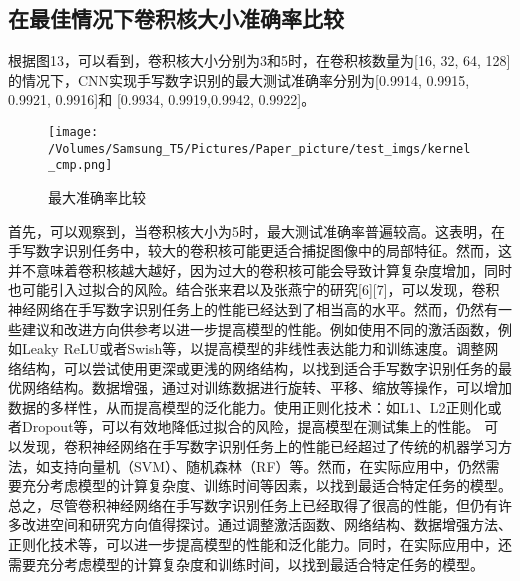 \documentclass[11pt]{article}
\begin{document}
\subsection{在最佳情况下卷积核大小准确率比较}
\label{sec:org0e7a34d}
根据图13，可以看到，卷积核大小分别为3和5时，在卷积核数量为[16, 32, 64, 128]的情况下，CNN实现手写数字识别的最大测试准确率分别为[0.9914, 0.9915, 0.9921, 0.9916]和 [0.9934, 0.9919,0.9942, 0.9922]。
\begin{figure}[htbp]
\centering
\texttt{[image: /Volumes/Samsung\_T5/Pictures/Paper\_picture/test\_imgs/kernel\_cmp.png]}
\caption{最大准确率比较}
\end{figure}

首先，可以观察到，当卷积核大小为5时，最大测试准确率普遍较高。这表明，在手写数字识别任务中，较大的卷积核可能更适合捕捉图像中的局部特征。然而，这并不意味着卷积核越大越好，因为过大的卷积核可能会导致计算复杂度增加，同时也可能引入过拟合的风险。结合张来君以及张燕宁的研究[6][7]，可以发现，卷积神经网络在手写数字识别任务上的性能已经达到了相当高的水平。然而，仍然有一些建议和改进方向供参考以进一步提高模型的性能。例如使用不同的激活函数，例如Leaky ReLU或者Swish等，以提高模型的非线性表达能力和训练速度。调整网络结构，可以尝试使用更深或更浅的网络结构，以找到适合手写数字识别任务的最优网络结构。数据增强，通过对训练数据进行旋转、平移、缩放等操作，可以增加数据的多样性，从而提高模型的泛化能力。使用正则化技术：如L1、L2正则化或者Dropout等，可以有效地降低过拟合的风险，提高模型在测试集上的性能。
可以发现，卷积神经网络在手写数字识别任务上的性能已经超过了传统的机器学习方法，如支持向量机（SVM）、随机森林（RF）等。然而，在实际应用中，仍然需要充分考虑模型的计算复杂度、训练时间等因素，以找到最适合特定任务的模型。总之，尽管卷积神经网络在手写数字识别任务上已经取得了很高的性能，但仍有许多改进空间和研究方向值得探讨。通过调整激活函数、网络结构、数据增强方法、正则化技术等，可以进一步提高模型的性能和泛化能力。同时，在实际应用中，还需要充分考虑模型的计算复杂度和训练时间，以找到最适合特定任务的模型。
\end{document}
